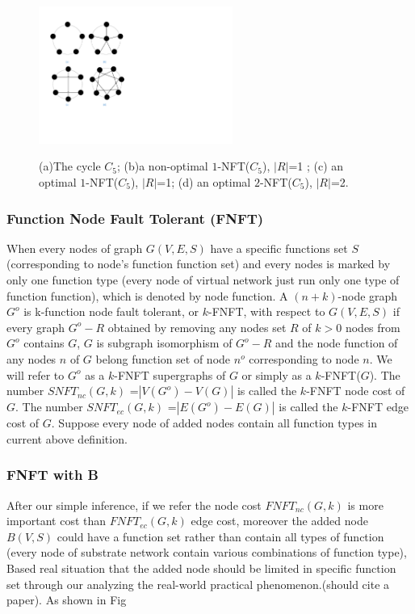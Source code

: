 \begin{figure}
  \centering 
  \includegraphics[width=2.5in]{Fig/NFTexample}\\
  \caption{(a)The cycle $C_5$; (b)a non-optimal $1$-NFT($C_5$), $|R|$=1 ; (c) an optimal $1$-NFT($C_5$), $|R|$=1; (d) an optimal $2$-NFT($C_5$), $|R|$=2. }\label{fig:NFTexample}
\end{figure}

\subsubsection{Function Node Fault Tolerant (FNFT)}
When every nodes of graph $G(V,E,S)$ have a specific functions set $S$ (corresponding to node's function function set) and every nodes is marked by only one function type (every node of virtual network just run only one type of function function), which is denoted by node function. A $(n+k)$-node graph $G^o$ is k-function node fault tolerant, or $k$-FNFT, with respect to $G(V,E,S)$ if every graph $G^o-R$ obtained by removing any nodes set $R$ of $k>0$ nodes from $G^o$ contains $G$, $G$ is subgraph isomorphism of $G^o-R$ and the node function of any nodes $n$ of $G$ belong function set of node $n^o$ corresponding to node $n$. We will refer to $G^o$ as a $k$-FNFT supergraphs of $G$ or simply as a $k$-FNFT($G$). The number $SNFT_{nc}$$(G,k)$ =$|V(G^o)-V(G)|$ is called the $k$-FNFT node cost of $G$. The number $SNFT_{ec}$$(G,k)$ =$|E(G^o)-E(G)|$ is called the $k$-FNFT edge cost of $G$. Suppose every node of added nodes contain all function types in current above definition.
\subsubsection{FNFT with B}
After our simple inference, if we refer the node cost $FNFT_{nc}(G,k)$  is more important cost than $FNFT_{ec}(G,k)$  edge cost, moreover the added node $B(V,S)$ could have a function set rather than contain all types of function (every node of substrate network contain various combinations of function type), Based real situation that the added node should be limited in specific function set through our analyzing the real-world practical phenomenon.(should cite a paper).
 As shown in Fig

